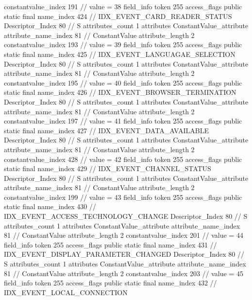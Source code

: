 {{{{{{{					constantvalue_index	191		// value = 38
				}
				}
			}
			field_info {
				token	255
				access_flags	public static final
				name_index	424		// IDX_EVENT_CARD_READER_STATUS
				Descriptor_Index	80		// S
				attributes_count	1
				attributes {
				ConstantValue_attribute {
					attribute_name_index	81		// ConstantValue
					attribute_length	2
					constantvalue_index	193		// value = 39
				}
				}
			}
			field_info {
				token	255
				access_flags	public static final
				name_index	425		// IDX_EVENT_LANGUAGAE_SELECTION
				Descriptor_Index	80		// S
				attributes_count	1
				attributes {
				ConstantValue_attribute {
					attribute_name_index	81		// ConstantValue
					attribute_length	2
					constantvalue_index	195		// value = 40
				}
				}
			}
			field_info {
				token	255
				access_flags	public static final
				name_index	426		// IDX_EVENT_BROWSER_TERMINATION
				Descriptor_Index	80		// S
				attributes_count	1
				attributes {
				ConstantValue_attribute {
					attribute_name_index	81		// ConstantValue
					attribute_length	2
					constantvalue_index	197		// value = 41
				}
				}
			}
			field_info {
				token	255
				access_flags	public static final
				name_index	427		// IDX_EVENT_DATA_AVAILABLE
				Descriptor_Index	80		// S
				attributes_count	1
				attributes {
				ConstantValue_attribute {
					attribute_name_index	81		// ConstantValue
					attribute_length	2
					constantvalue_index	428		// value = 42
				}
				}
			}
			field_info {
				token	255
				access_flags	public static final
				name_index	429		// IDX_EVENT_CHANNEL_STATUS
				Descriptor_Index	80		// S
				attributes_count	1
				attributes {
				ConstantValue_attribute {
					attribute_name_index	81		// ConstantValue
					attribute_length	2
					constantvalue_index	199		// value = 43
				}
				}
			}
			field_info {
				token	255
				access_flags	public static final
				name_index	430		// IDX_EVENT_ACCESS_TECHNOLOGY_CHANGE
				Descriptor_Index	80		// S
				attributes_count	1
				attributes {
				ConstantValue_attribute {
					attribute_name_index	81		// ConstantValue
					attribute_length	2
					constantvalue_index	201		// value = 44
				}
				}
			}
			field_info {
				token	255
				access_flags	public static final
				name_index	431		// IDX_EVENT_DISPLAY_PARAMETER_CHANGED
				Descriptor_Index	80		// S
				attributes_count	1
				attributes {
				ConstantValue_attribute {
					attribute_name_index	81		// ConstantValue
					attribute_length	2
					constantvalue_index	203		// value = 45
				}
				}
			}
			field_info {
				token	255
				access_flags	public static final
				name_index	432		// IDX_EVENT_LOCAL_CONNECTION
}}}}}
